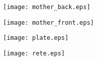 \documentclass[a4paper,onecolumn,10pt]{article}
\begin{document}
\centerline{\texttt{[image: mother\_back.eps]}}
\centerline{\texttt{[image: mother\_front.eps]}}
\centerline{\texttt{[image: plate.eps]}}
\centerline{\texttt{[image: rete.eps]}}
\end{document}
